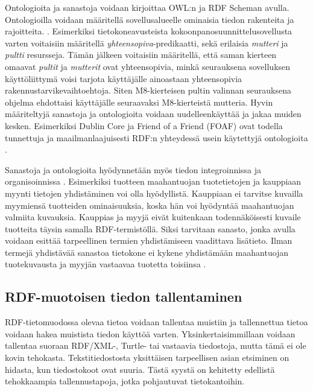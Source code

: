 \documentclass[finnish, 12pt, a4paper, elec, utf8, pdfa, online]{aaltothesis}
\begin{document}
{Ontologioita ja sanastoja voidaan kirjoittaa OWL:n ja RDF Scheman avulla. Ontologioilla voidaan määritellä sovellusalueelle ominaisia tiedon rakenteita ja rajoitteita. \cite{vocabulary}. Esimerkiksi tietokoneavusteista kokoonpanosuunnittelusovellusta varten voitaisiin määritellä \textit{yhteensopiva}-predikaatti, sekä erilaisia \textit{mutteri} ja \textit{pultti} resursseja. Tämän jälkeen voitaisiin määritellä, että saman kierteen omaavat \textit{pultit} ja \textit{mutterit} ovat yhteensopivia, minkä seurauksena sovelluksen käyttöliittymä voisi tarjota käyttäjälle ainoastaan yhteensopivia rakennustarvikevaihtoehtoja. Siten M8-kierteisen pultin valinnan seurauksena ohjelma ehdottaisi käyttäjälle seuraavaksi M8-kierteistä mutteria. Hyvin määriteltyjä sanastoja ja ontologioita voidaan uudelleenkäyttää ja jakaa muiden kesken. Esimerkiksi Dublin Core ja Friend of a Friend (FOAF) ovat todella tunnettuja ja maailmanlaajuisesti RDF:n yhteydessä usein käytettyjä ontologioita \cite{data_namespace}.

Sanastoja ja ontologioita hyödynnetään myös tiedon integroinnissa ja organisoinnissa \cite{vocabulary}. Esimerkiksi tuotteen maahantuojan tuotetietojen ja kauppiaan myynti tietojen yhdistäminen voi olla hyödyllistä. Kauppiaan ei tarvitse kuvailla myymiensä tuotteiden ominaisuuksia, koska hän voi hyödyntää maahantuojan valmiita kuvauksia. Kauppias ja myyjä eivät kuitenkaan todennäköisesti kuvaile tuotteita täysin samalla RDF-termistöllä. Siksi tarvitaan sanasto, jonka avulla voidaan esittää tarpeellinen termien yhdistämiseen vaadittava lisätieto. Ilman termejä yhdistävää sanastoa tietokone ei kykene yhdistämään maahantuojan tuotekuvausta ja myyjän vastaavaa tuotetta toisiinsa \cite{vocabulary}.


\subsection{RDF-muotoisen tiedon tallentaminen}
RDF-tietomuodossa olevaa tietoa voidaan tallentaa muistiin ja tallennettua tietoa voidaan hakea muistista tiedon käyttöä varten. Yksinkertaisimmillaan voidaan tallentaa suoraan RDF/XML-, Turtle- tai vastaavia tiedostoja, mutta tämä ei ole kovin tehokasta. Tekstitiedostosta yksittäisen tarpeellisen asian etsiminen on hidasta, kun tiedostokoot ovat suuria. Tästä syystä on kehitetty edellistä tehokkaampia tallennustapoja, jotka pohjautuvat tietokantoihin.

}
\end{document}
